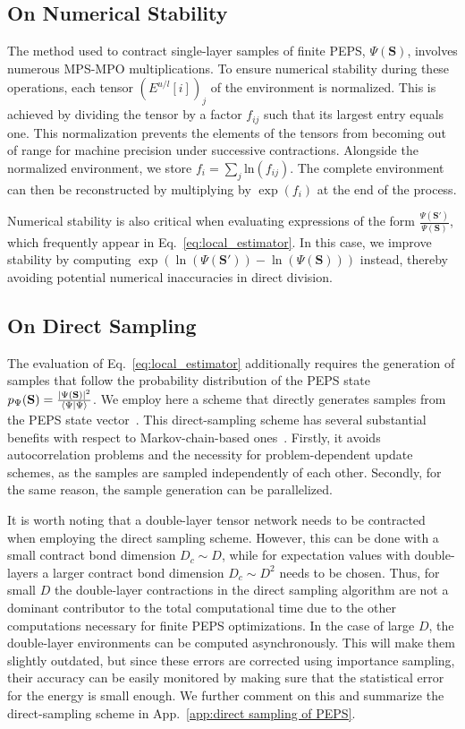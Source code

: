 \documentclass[aps,notitlepage,twocolumn,nofootinbib,superscriptaddress,pra,10pt]{revtex4-2}
\begin{document}
\subsection{On Numerical Stability}
The method used to contract single-layer samples of finite PEPS, $\Psi(\textbf{S})$, involves numerous MPS-MPO multiplications. 
To ensure numerical stability during these operations, each tensor $(E^{u/l}[i])_j$ of the environment is normalized. 
This is achieved by dividing the tensor by a factor $f_{ij}$ such that its largest entry equals one. This normalization prevents the elements of the tensors from becoming out of range for machine precision under successive contractions. 
%
Alongside the normalized environment, we store $f_i = \sum_j \text{ln}(f_{ij})$. The complete environment can then be reconstructed by multiplying by $\exp(f_i)$ at the end of the process. 

Numerical stability is also critical when evaluating expressions of the form $\frac{\Psi(\textbf{S}')}{\Psi(\textbf{S})}$, which frequently appear in Eq.~\eqref{eq:local_estimator}. In this case, we improve stability by computing $\exp{(\ln{(\Psi(\textbf{S}'))} - \ln{(\Psi(\textbf{S}))})}$ instead, thereby avoiding potential numerical inaccuracies in direct division.

\subsection{On Direct Sampling}

The evaluation of Eq.~\eqref{eq:local_estimator} additionally requires the generation of samples that follow the probability distribution of the PEPS state $p_{\Psi}(\textbf{S}) = \frac{|\Psi(\textbf{S})|^2}{\braket{\Psi|\Psi}}$.
We employ here a scheme that directly generates samples from the PEPS state vector~\cite{Vieijra21_directsampling_PEPS}.
This direct-sampling scheme has several substantial benefits with respect to Markov-chain-based ones~\cite{Liu2017_gradient_fPEPS}.
Firstly, it avoids autocorrelation problems and the necessity for problem-dependent update schemes, as the samples are sampled independently of each other. Secondly, for the same reason, the sample generation can be parallelized. 

It is worth noting that a double-layer tensor network needs to be contracted when employing the direct sampling scheme. 
However, this can be done with a small contract bond dimension $D_c \sim D$, while for expectation values with double-layers a larger contract bond dimension $D_c \sim D^2$ needs to be chosen.
Thus, for small $D$ the double-layer contractions in the direct sampling algorithm are not a dominant contributor to the total computational time due to the other computations necessary for finite PEPS optimizations. 
In the case of large $D$, the double-layer environments can be computed asynchronously.
This will make them slightly outdated, but since these errors are corrected using importance sampling, their accuracy can be easily monitored by making sure that the statistical error for the energy is small enough.
%
We further comment on this and summarize the direct-sampling scheme in App.~\ref{app:direct sampling of PEPS}.
\end{document}

